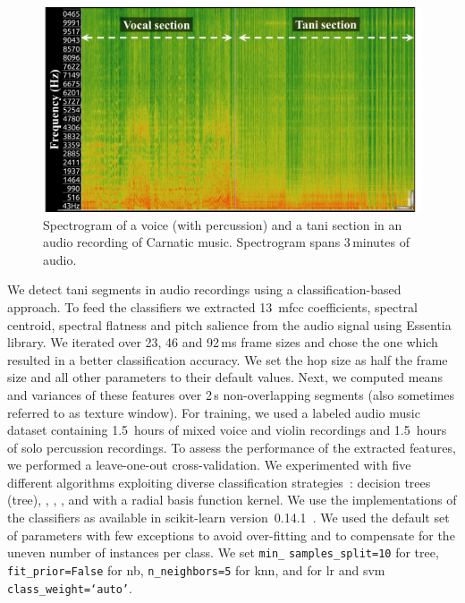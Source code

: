 {\begin{figure}
	\begin{center}
		\includegraphics[width=\figSizeEighty]{ch05_preprocessing/figures/spectrogramTani.png}
	\end{center}
	\caption{Spectrogram of a voice (with percussion) and a \gls{tani} section in an audio recording of Carnatic music. Spectrogram spans 3\,minutes of audio.}
	\label{fig:spectrogram_of_tani_segment}
\end{figure}

We detect \gls{tani} segments in audio recordings using a classification-based approach. To feed the classifiers we extracted 13~\acrshort{mfcc} coefficients, spectral centroid, spectral flatness and pitch salience from the audio signal using Essentia~\citep{essentia} library. We iterated over 23, 46 and 92\,ms frame sizes and chose the one which resulted in a better classification accuracy. We set the hop size as half the frame size and all other parameters to their default values. Next, we computed means and variances of these features over 2\,s non-overlapping segments (also sometimes referred to as texture window). For training, we used a labeled audio music dataset containing 1.5~hours of mixed voice and violin recordings and 1.5~hours of solo percussion recordings. To assess the performance of the extracted features, we performed a leave-one-out cross-validation. We experimented with five different algorithms exploiting diverse classification strategies~\cite{Hastie09BOOK}: decision trees (\acrshort{tree}), , , , and  with a radial basis function kernel. We use the implementations of the classifiers as available in scikit-learn version~0.14.1~\citep{scikitlearn}. We used the default set of parameters with few exceptions to avoid over-fitting and to compensate for the uneven number of instances per class. We set \texttt{min\_} \texttt{samples\_split=10} for \acrshort{tree}, \texttt{fit\_prior=False} for \gls{nb}, \texttt{n\_neighbors=5} for \gls{knn}, and for \gls{lr} and \gls{svm} \texttt{class\_weight=`auto'}. 

}
